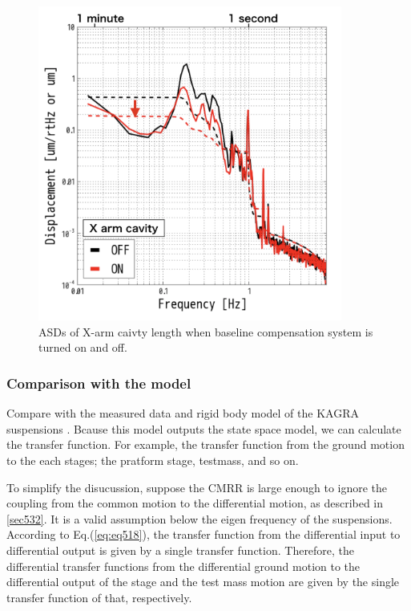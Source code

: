 \begin{figure}[h]
  \centering
  \includegraphics[width=10cm]{./img_chap6/img611.png}
  \caption{ASDs of X-arm caivty length when baseline compensation system is turned on and off. }\label{img:img611}
\end{figure}

\subsubsection{Comparison with the model}
Compare with the measured data and rigid body model of the KAGRA suspensions \cite{sekiguchi2016astudy}. Bcause this model outputs the state space model, we can calculate the transfer function. For example, the transfer function from the ground motion to the each stages; the pratform stage, testmass, and so on.

To simplify the disucussion, suppose the CMRR is large enough to ignore the coupling from the common motion to the differential motion, as described in \cref{sec532}. It is a valid assumption below the eigen frequency of the suspensions. According to Eq.(\ref{eq:eq518}), the transfer function from the differential input to differential output is given by a single transfer function. Therefore, the differential transfer functions from the differential ground motion to the differential output of the stage and the test mass motion are given by the single transfer function of that, respectively.

